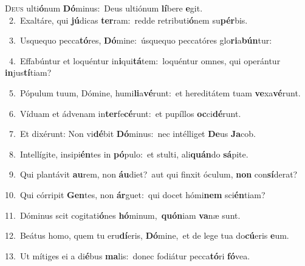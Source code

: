 \lettrine{\initial\textcolor{\initialcolor}{D}}{eus} ulti\-\textbf{ó}\-num \textbf{Dó}\-minus:~\star Deus ultiónum \textbf{lí}\-bere \textbf{e}\-git.\\
{\numbfont\textcolor{\numbcolor}{~2.}}~Exaltáre, qui \textbf{jú}\-dicas \textbf{ter}\-ram:~\star redde retributi\-\textbf{ó}\-nem su\-\textbf{pér}\-bis.\par
{\numbfont\textcolor{\numbcolor}{~3.}}~Usquequo pecca\-\textbf{tó}\-res, \textbf{Dó}\-mine:~\star úsquequo peccatóres glo\-\textbf{ri}\-a\-\textbf{bún}\-tur:\par
{\numbfont\textcolor{\numbcolor}{~4.}}~Effabúntur et loquéntur in\-\textbf{i}\-qui\-\textbf{tá}\-tem:~\star loquéntur omnes, qui operántur \textbf{in}\-jus\-\textbf{tí}\-tiam?\par
{\numbfont\textcolor{\numbcolor}{~5.}}~Pópulum tuum, Dómine, humi\-\textbf{li}\-a\-\textbf{vé}\-runt:~\star et hereditátem tuam \textbf{ve}\-xa\-\textbf{vé}\-runt.\par
{\numbfont\textcolor{\numbcolor}{~6.}}~Víduam et ádvenam in\-\textbf{ter}\-fe\-\textbf{cé}\-runt:~\star et pupíllos \textbf{oc}\-ci\-\textbf{dé}\-runt.\par
{\numbfont\textcolor{\numbcolor}{~7.}}~Et dixérunt: Non vi\-\textbf{dé}\-bit \textbf{Dó}\-minus:~\star nec intélliget \textbf{De}\-us \textbf{Ja}\-cob.\par
{\numbfont\textcolor{\numbcolor}{~8.}}~Intellígite, insipi\-\textbf{én}\-tes in \textbf{pó}\-pulo:~\star et stulti, ali\-\textbf{quán}\-do \textbf{sá}\-pite.\par
{\numbfont\textcolor{\numbcolor}{~9.}}~Qui plantávit \textbf{au}\-rem, non \textbf{áu}\-diet?~\star aut qui finxit óculum, \textbf{non} con\-\textbf{sí}\-derat?\par
{\numbfont\textcolor{\numbcolor}{10.}}~Qui córripit \textbf{Gen}\-tes, non \textbf{ár}\-guet:~\star qui docet hómi\textbf{nem} sci\-\textbf{én}\-tiam?\par
{\numbfont\textcolor{\numbcolor}{11.}}~Dóminus scit cogitati\-\textbf{ó}\-nes \textbf{hó}\-minum,~\star \textbf{quón}\-iam \textbf{va}\-næ sunt.\par
{\numbfont\textcolor{\numbcolor}{12.}}~Beátus homo, quem tu eru\-\textbf{dí}\-eris, \textbf{Dó}\-mine,~\star et de lege tua do\-\textbf{cú}\-eris \textbf{e}\-um.\par
{\numbfont\textcolor{\numbcolor}{13.}}~Ut mítiges ei a di\-\textbf{é}\-bus \textbf{ma}\-lis:~\star donec fodiátur pecca\-\textbf{tó}\-ri \textbf{fó}\-vea.\par
